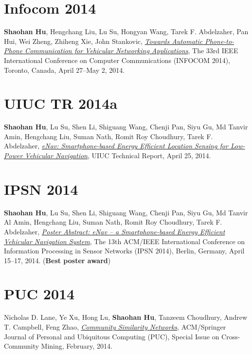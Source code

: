 \section{\sc Infocom 2014}\hypertarget{hu2014infocom}{} \textbf{Shaohan Hu}, Hengchang Liu, Lu Su, Hongyan Wang, Tarek F. Abdelzaher, Pan Hui, Wei Zheng, Zhiheng Xie, John Stankovic, \href{http://ieeexplore.ieee.org/xpl/articleDetails.jsp?arnumber=6848113}{\emph{Towards Automatic Phone-to-Phone Communication for Vehicular Networking Applications}}, \textsf{The 33rd IEEE International Conference on Computer Communications (INFOCOM 2014)}, Toronto, Canada, April 27--May 2, 2014.

\section{\sc UIUC TR 2014a }\hypertarget{hu2014uiuc1}{} \textbf{Shaohan Hu}, Lu Su, Shen Li, Shiguang Wang, Chenji Pan, Siyu Gu, Md Tanvir Amin, Hengchang Liu, Suman Nath, Romit Roy Choudhury, Tarek F. Abdelzaher, \href{https://www.ideals.illinois.edu/handle/2142/48917}{\emph{eNav: Smartphone-based Energy Efficient Location Sensing for Low-Power Vehicular Navigation}}, \textsf{UIUC Technical Report}, April 25, 2014.

\section{\sc IPSN 2014}\hypertarget{hu2014ipsn}{} \textbf{Shaohan Hu}, Lu Su, Shen Li, Shiguang Wang, Chenji Pan, Siyu Gu, Md Tanvir Al Amin, Hengchang Liu, Suman Nath, Romit Roy Choudhury, Tarek F. Abdelzaher, \href{http://dl.acm.org/citation.cfm?id=2602374}{\emph{Poster Abstract: eNav -- a Smartphone-based Energy Efficient Vehicular Navigation System}}, \textsf{The 13th ACM/IEEE International Conference on Information Processing in Sensor Networks (IPSN 2014)}, Berlin, Germany, April 15--17, 2014. (\textbf{Best poster award})

\section{\sc PUC 2014}\hypertarget{lane2013puc}{} Nicholas D. Lane, Ye Xu, Hong Lu, \textbf{Shaohan Hu}, Tanzeem Choudhury, Andrew T. Campbell, Feng Zhao, \href{http://link.springer.com/article/10.1007/s00779-013-0655-1}{\emph{Community Similarity Networks}}, \textsf{ACM/Springer Journal of Personal and Ubiquitous Computing (PUC), Special Issue on Cross-Community Mining}, February, 2014.

